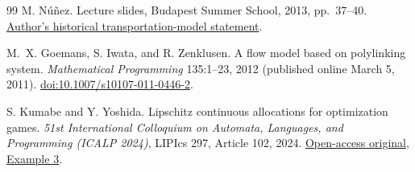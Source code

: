 \documentclass[11pt]{article}
\theoremstyle{remark}
\begin{document}
\begin{thebibliography}{99}
M. N\'u\~nez.
Lecture slides, Budapest Summer School, 2013, pp.~37--40.
\href{https://archive.illc.uva.nl/COST-IC1205/documents/Budapest-2013-Slides/Nunez.pdf}{Author's historical transportation-model statement}.

M.~X. Goemans, S. Iwata, and R. Zenklusen.
A flow model based on polylinking system.
\emph{Mathematical Programming} 135:1--23, 2012
(published online March 5, 2011).
\href{https://doi.org/10.1007/s10107-011-0446-2}{doi:10.1007/s10107-011-0446-2}.

S. Kumabe and Y. Yoshida.
Lipschitz continuous allocations for optimization games.
\emph{51st International Colloquium on Automata, Languages, and Programming
(ICALP 2024)}, LIPIcs 297, Article 102, 2024.
\href{https://drops.dagstuhl.de/storage/00lipics/lipics-vol297-icalp2024/LIPIcs.ICALP.2024.102/LIPIcs.ICALP.2024.102.pdf}{Open-access original, Example 3}.

\end{thebibliography}
\end{document}
